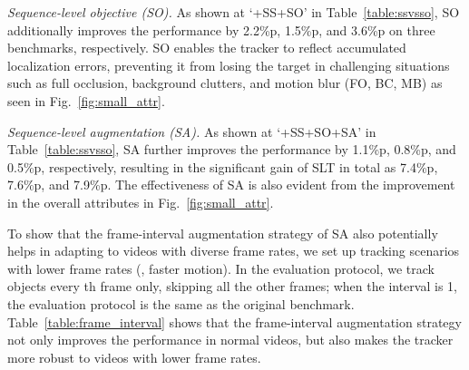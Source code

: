 \textit{Sequence-level objective (SO).}
As shown at `+SS+SO' in Table~\ref{table:ssvsso}, SO additionally improves the performance by 2.2\%p, 1.5\%p, and 3.6\%p on three benchmarks, respectively.
SO enables the tracker to reflect accumulated localization errors, preventing it from losing the target in challenging situations such as full occlusion, background clutters, and motion blur (FO, BC, MB) as seen in Fig.~\ref{fig:small_attr}.

\textit{Sequence-level augmentation (SA).}
As shown at `+SS+SO+SA' in Table~\ref{table:ssvsso}, SA further improves the performance by 1.1\%p, 0.8\%p, and 0.5\%p, respectively, resulting in the significant gain of SLT in total as 7.4\%p, 7.6\%p, and 7.9\%p. The effectiveness of SA is also evident from the improvement in the overall attributes in Fig.~\ref{fig:small_attr}.

To show that the frame-interval augmentation strategy of SA also potentially helps in adapting to videos with diverse frame rates, we set up tracking scenarios with lower frame rates (\ie, faster motion).
In the evaluation protocol, we track objects  every th frame only, skipping all the other frames; 
when the interval is 1, the evaluation protocol is the same as the original benchmark.
Table~\ref{table:frame_interval} shows that the frame-interval augmentation strategy not only improves the performance in normal videos, but also makes the tracker more robust to videos with lower frame rates.

